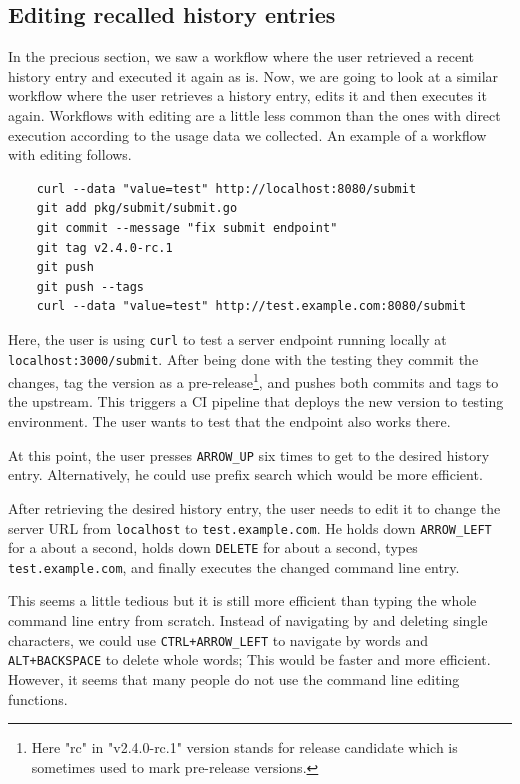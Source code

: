 \documentclass[thesis=M,english]{FITthesis}[2012/10/20]
\begin{document}
\subsection{Editing recalled history entries}

In the precious section, we saw a workflow where the user retrieved a recent history entry and executed it again as is. Now, we are going to look at a similar workflow where the user retrieves a history entry, edits it and then executes it again. Workflows with editing are a little less common than the ones with direct execution according to the usage data we collected. An example of a workflow with editing follows.

\begin{verbatim}
    curl --data "value=test" http://localhost:8080/submit
    git add pkg/submit/submit.go
    git commit --message "fix submit endpoint"
    git tag v2.4.0-rc.1
    git push
    git push --tags
    curl --data "value=test" http://test.example.com:8080/submit
\end{verbatim}


Here, the user is using \verb|curl| to test a server endpoint running locally at \verb|localhost:3000/submit|.  After being done with the testing they commit the changes, tag the version as a pre-release\footnote{Here "rc" in "v2.4.0-rc.1" version stands for release candidate which is sometimes used to mark pre-release versions.}, and pushes both commits and tags to the upstream. This triggers a CI pipeline that deploys the new version to testing environment. The user wants to test that the endpoint also works there.

At this point, the user presses \verb|ARROW_UP| six times to get to the desired history entry. Alternatively, he could use prefix search which would be more efficient.

After retrieving the desired history entry, the user needs to edit it to change the server URL from \verb|localhost| to \verb|test.example.com|. He holds down \verb|ARROW_LEFT| for a about a second, holds down \verb|DELETE| for about a second, types \verb|test.example.com|, and finally executes the changed command line entry. 

This seems a little tedious but it is still more efficient than typing the whole command line entry from scratch. Instead of navigating by and deleting single characters, we could use \verb|CTRL+ARROW_LEFT| to navigate by words and \verb|ALT+BACKSPACE| to delete whole words; This would be faster and more efficient. However, it seems that many people do not use the command line editing functions.
\end{document}
